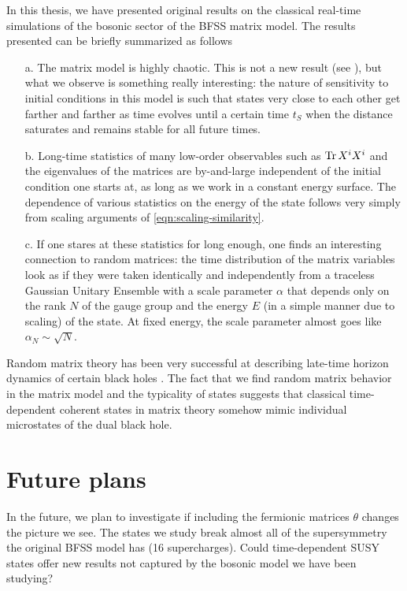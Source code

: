 In this thesis, we have presented original results on the classical real-time simulations of the bosonic sector of the BFSS matrix model. The results presented can be briefly summarized as follows
\begin{enumerate}
    \item[a.] The matrix model is highly chaotic. This is not a new result (see \cite{Berkowitz:2016znt,Gur-Ari:2015rcq}), but what we observe is something really interesting: the nature of sensitivity to initial conditions in this model is such that states very close to each other get farther and farther as time evolves until a certain time $t_S$ when the distance saturates and remains stable for all future times.
    \item[b.] Long-time statistics of many low-order observables such as $\Tr X^i X^i$ and the eigenvalues of the matrices are by-and-large independent of the initial condition one starts at, as long as we work in a constant energy surface. The dependence of various statistics on the energy of the state follows very simply from scaling arguments of \cref{eqn:scaling-similarity}.
    \item[c.] If one stares at these statistics for long enough, one finds an interesting connection to random matrices: the time distribution of the matrix variables look as if they were taken identically and independently from a traceless Gaussian Unitary Ensemble with a scale parameter $\alpha$ that depends only on the rank $N$ of the gauge group and the energy $E$ (in a simple manner due to scaling) of the state. At fixed energy, the scale parameter almost goes like $\alpha_N \sim \sqrt{N}$.
\end{enumerate}
Random matrix theory has been very successful at describing late-time horizon dynamics of certain black holes \cite{Cotler:2016fpe}. The fact that we find random matrix behavior in the matrix model and the typicality of states suggests that classical time-dependent coherent states in matrix theory somehow mimic individual microstates of the dual black hole.

\section{Future plans}

In the future, we plan to investigate if including the fermionic matrices $\theta$ changes the picture we see. The states we study break almost all of the supersymmetry the original BFSS model has (16 supercharges). Could time-dependent SUSY states offer new results not captured by the bosonic model we have been studying?

